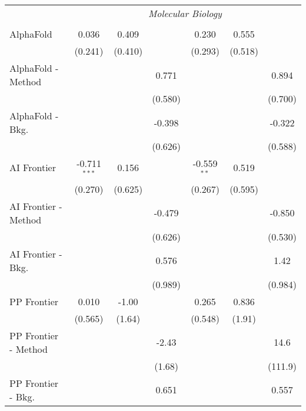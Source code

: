 \begin{tabular}{lcccccc}
 & \multicolumn{6}{c}{\textit{Molecular Biology}} \\ \\
   AlphaFold            & 0.036          & 0.409   &               & 0.230         & 0.555        &   \\   
                        & (0.241)        & (0.410) &               & (0.293)       & (0.518)      &   \\   
   AlphaFold - Method   &                &         & 0.771         &               &              & 0.894\\   
                        &                &         & (0.580)       &               &              & (0.700)\\   
   AlphaFold - Bkg.     &                &         & -0.398        &               &              & -0.322\\   
                        &                &         & (0.626)       &               &              & (0.588)\\   
   AI Frontier          & -0.711$^{***}$ & 0.156   &               & -0.559$^{**}$ & 0.519        &   \\   
                        & (0.270)        & (0.625) &               & (0.267)       & (0.595)      &   \\   
   AI Frontier - Method &                &         & -0.479        &               &              & -0.850\\   
                        &                &         & (0.626)       &               &              & (0.530)\\   
   AI Frontier - Bkg.   &                &         & 0.576         &               &              & 1.42\\   
                        &                &         & (0.989)       &               &              & (0.984)\\   
   PP Frontier          & 0.010          & -1.00   &               & 0.265         & 0.836        &   \\   
                        & (0.565)        & (1.64)  &               & (0.548)       & (1.91)       &   \\   
   PP Frontier - Method &                &         & -2.43         &               &              & 14.6\\   
                        &                &         & (1.68)        &               &              & (111.9)\\   
   PP Frontier - Bkg.   &                &         & 0.651         &               &              & 0.557\\   

\end{tabular}

